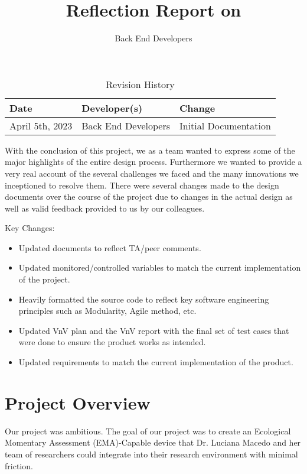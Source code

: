 \documentclass{article}
\title{Reflection Report on \progname}
\author{Back End Developers}
\date{}
\begin{document}
\begin{table}[hp]
\caption{Revision History} \label{TblRevisionHistory}
\begin{tabularx}{\textwidth}{llX}
\toprule
\textbf{Date} & \textbf{Developer(s)} & \textbf{Change}\\
\midrule
April 5th, 2023 & Back End Developers & Initial Documentation\\
\bottomrule
\end{tabularx}
\end{table}

\newpage

\maketitle

With the conclusion of this project, we as a team wanted to express some of the major highlights of the entire design process. Furthermore we wanted to provide a very real account of the several challenges we faced and the many innovations we inceptioned to resolve them. 
There were several changes made to the design documents over the course of the project due to changes in the actual design as well as valid feedback provided to us by our colleagues.


Key Changes:
\begin{itemize}
\item Updated documents to reflect TA/peer comments.
\item Updated monitored/controlled variables to match the current implementation of the project.
\item Heavily formatted the source code to reflect key software engineering principles such as Modularity, Agile method, etc.
\item Updated VnV plan and the VnV report with the final set of test cases that were done to ensure the product works as intended.
\item Updated requirements to match the current implementation of the product.
\end{itemize}

\section{Project Overview}

Our project was ambitious. The goal of our project was to create an Ecological Momentary Assessment (EMA)-Capable device that Dr. Luciana Macedo and her team of researchers could integrate into their research environment with minimal friction.\\
\end{document}
